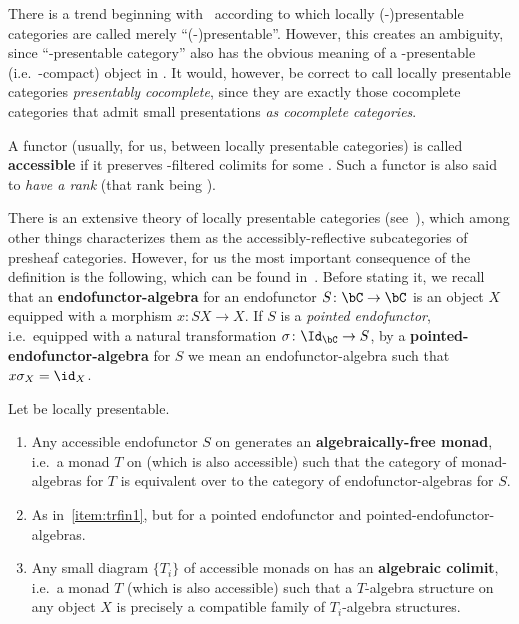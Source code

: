 \documentclass{amsart}
\begin{document}
\begin{rmk}
  There is a trend beginning with~\cite{lurie:higher-topoi} according to which locally \mbox{(\ka-)}presentable categories are called merely ``\mbox{(\ka-)}presentable''.
  However, this creates an ambiguity, since ``\ka-presentable category'' also has the obvious meaning of a \ka-presentable (i.e.\ \ka-compact) object in \bCat.
  It would, however, be correct to call locally presentable categories \emph{presentably cocomplete}, since they are exactly those cocomplete categories that admit small presentations \emph{as cocomplete categories}.
\end{rmk}

A functor (usually, for us, between locally presentable categories) is called \textbf{accessible} if it preserves \ka-filtered colimits for some \ka.
Such a functor is also said to \emph{have a rank} (that rank being \ka).

There is an extensive theory of locally presentable categories (see~\cite{ar:loc-pres}), which among other things characterizes them as the accessibly-reflective subcategories of presheaf categories.
However, for us the most important consequence of the definition is the following, which can be found in~\cite{kelly:transfinite}.
Before stating it, we recall that an \textbf{endofunctor-algebra} for an endofunctor $S\colon \bC\to\bC$ is an object $X$ equipped with a morphism $x\colon S X\to X$.
If $S$ is a \emph{pointed endofunctor}, i.e.\ equipped with a natural transformation $\si\colon\Id_\bC \to S$, by a \textbf{pointed-endofunctor-algebra} for $S$ we mean an endofunctor-algebra such that $x \si_X = \id_X$.

\begin{thm}\label{thm:trfin}
  Let \bC be locally presentable.
  \begin{enumerate}
  \item Any accessible endofunctor $S$ on \bC generates an \textbf{algebraically-free monad}, i.e.\ a monad $T$ on \bC (which is also accessible) such that the category of monad-algebras for $T$ is equivalent over \bC to the category of endofunctor-algebras for $S$.\label{item:trfin1}
  \item As in~\ref{item:trfin1}, but for a pointed endofunctor and pointed-endofunctor-algebras.
  \item Any small diagram $\{T_i\}$ of accessible monads on \bC has an \textbf{algebraic colimit}, i.e.\ a monad $T$ (which is also accessible) such that a $T$-algebra structure on any object $X$ is precisely a compatible family of $T_i$-algebra structures.
  \end{enumerate}
\end{thm}
\end{document}

